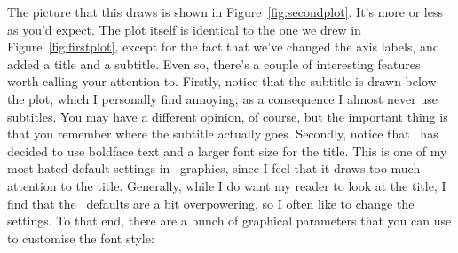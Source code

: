 The picture that this draws is shown in Figure~\ref{fig:secondplot}. It's more or less as you'd expect. The plot itself is identical to the one we drew in Figure~\ref{fig:firstplot}, except for the fact that we've changed the axis labels, and added a title and a subtitle. Even so, there's a couple of interesting features worth calling your attention to. Firstly, notice that the subtitle is drawn below the plot, which I personally find annoying; as a consequence I almost never use subtitles. You may have a different opinion, of course, but the important thing is that you remember where the subtitle actually goes.  Secondly, notice that \R\ has decided to use boldface text and a larger font size for the title. This is one of my most hated default settings in \R\ graphics, since I feel that it draws too much attention to the title. Generally, while I do want my reader to look at the title, I find that the \R\ defaults are a bit overpowering, so I often like to change the settings. To that end, there are a bunch of graphical parameters that you can use to customise the font style:

